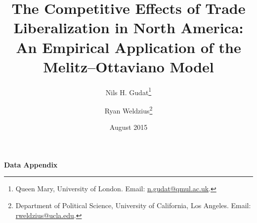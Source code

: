 \documentclass[11pt]{article}
\begin{document}
\title{The Competitive Effects of Trade Liberalization in North America: An Empirical Application of the Melitz--Ottaviano Model}
\author{Nils H. Gudat\thanks{Queen Mary, University of London. Email: \href{mailto:n.gudat@qmul.ac.uk}{n.gudat@qmul.ac.uk}.} } 
\author{Ryan Weldzius\thanks{Department of Political Science, University of California, Los Angeles. Email: \href{mailto:rweldzius@ucla.edu}{rweldzius@ucla.edu}.}}
\affil{}

\date{August 2015}
\maketitle

\begin{center}
\textbf{\LARGE Data Appendix} 
\end{center}
\end{document}

